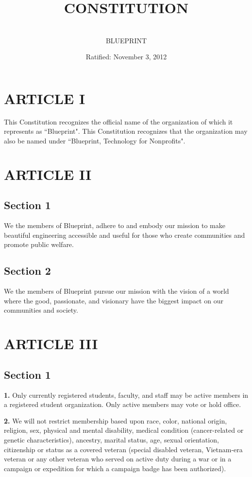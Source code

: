 \documentclass{article}
\title{CONSTITUTION}
\author{\\ \sc BLUEPRINT}
\date{Ratified: November 3, 2012 }
\begin{document}
\maketitle

\section{ARTICLE I}
This Constitution recognizes the official name of the organization of which it represents as ``Blueprint". This Constitution recognizes that the organization may also be named under ``Blueprint, Technology for Nonprofits".

\section{ARTICLE II}
\subsection{Section 1}
We the members of Blueprint, adhere to and embody our mission to make beautiful engineering accessible and useful for those who create communities and promote public welfare.

\subsection{Section 2}
We the members of Blueprint pursue our mission with the vision of a world where the good, passionate, and visionary have the biggest impact on our communities and society.

\section{ARTICLE III}
\subsection{Section 1}

\textbf{1.} Only currently registered students, faculty, and staff may be active members in a registered student organization. Only active members may vote or hold office.

\textbf{2.} We will not restrict membership based upon race, color, national origin, religion, sex, physical and mental disability, medical condition (cancer-related or genetic characteristics), ancestry, marital status, age, sexual orientation, citizenship or status as a covered veteran (special disabled veteran, Vietnam-era veteran or any other veteran who served on active duty during a war or in a campaign or expedition for which a campaign badge has been authorized).
\end{document}
